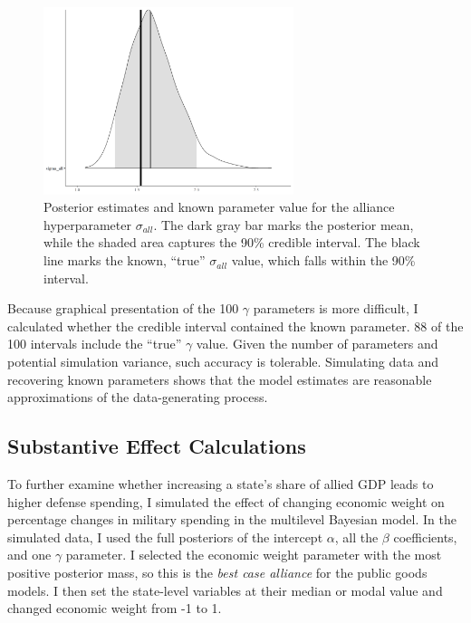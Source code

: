 \documentclass[12pt]{article}
\begin{document}
\begin{figure}[htbp]
	\centering
		\includegraphics[width=0.65\textwidth]{sall-sim-res.png}
	\caption{Posterior estimates and known parameter value for the alliance hyperparameter $\sigma_{all}$. The dark gray bar marks the posterior mean, while the shaded area captures the 90\% credible interval. The black line marks the known, ``true'' $\sigma_{all}$ value, which falls within the 90\% interval.}
	\label{fig:sall-sim-res}
\end{figure}


Because graphical presentation of the 100 $\gamma$ parameters is more difficult, I calculated whether the credible interval contained the known parameter. 
88 of the 100 intervals include the ``true'' $\gamma$ value. 
Given the number of parameters and potential simulation variance, such accuracy is tolerable. 
Simulating data and recovering known parameters shows that the model estimates are reasonable approximations of the data-generating process. 


\subsection{Substantive Effect Calculations}

To further examine whether increasing a state's share of allied GDP leads to higher defense spending, I simulated the effect of changing economic weight on percentage changes in military spending in the multilevel Bayesian model. 
In the simulated data, I used the full posteriors of the intercept $\alpha$, all the $\beta$ coefficients, and one $\gamma$ parameter. 
I selected the economic weight parameter with the most positive posterior mass, so this is the \emph{best case alliance} for the public goods models. 
I then set the state-level variables at their median or modal value and changed economic weight from -1 to 1. 
\end{document}
